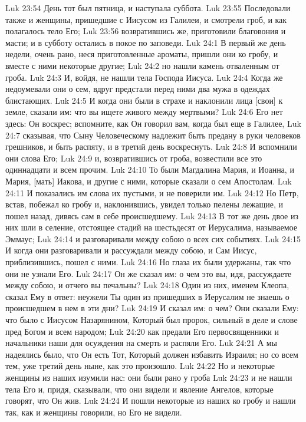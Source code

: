 Luk 23:54  День тот был пятница, и наступала суббота.
Luk 23:55  Последовали также и женщины, пришедшие с Иисусом из Галилеи, и смотрели гроб, и как полагалось тело Его;
Luk 23:56  возвратившись же, приготовили благовония и масти; и в субботу остались в покое по заповеди.
Luk 24:1  В первый же день недели, очень рано, неся приготовленные ароматы, пришли они ко гробу, и вместе с ними некоторые другие;
Luk 24:2  но нашли камень отваленным от гроба.
Luk 24:3  И, войдя, не нашли тела Господа Иисуса.
Luk 24:4  Когда же недоумевали они о сем, вдруг предстали перед ними два мужа в одеждах блистающих.
Luk 24:5  И когда они были в страхе и наклонили лица [свои] к земле, сказали им: что вы ищете живого между мертвыми?
Luk 24:6  Его нет здесь: Он воскрес; вспомните, как Он говорил вам, когда был еще в Галилее,
Luk 24:7  сказывая, что Сыну Человеческому надлежит быть предану в руки человеков грешников, и быть распяту, и в третий день воскреснуть.
Luk 24:8  И вспомнили они слова Его;
Luk 24:9  и, возвратившись от гроба, возвестили все это одиннадцати и всем прочим.
Luk 24:10  То были Магдалина Мария, и Иоанна, и Мария, [мать] Иакова, и другие с ними, которые сказали о сем Апостолам.
Luk 24:11  И показались им слова их пустыми, и не поверили им.
Luk 24:12  Но Петр, встав, побежал ко гробу и, наклонившись, увидел только пелены лежащие, и пошел назад, дивясь сам в себе происшедшему.
Luk 24:13  В тот же день двое из них шли в селение, отстоящее стадий на шестьдесят от Иерусалима, называемое Эммаус;
Luk 24:14  и разговаривали между собою о всех сих событиях.
Luk 24:15  И когда они разговаривали и рассуждали между собою, и Сам Иисус, приблизившись, пошел с ними.
Luk 24:16  Но глаза их были удержаны, так что они не узнали Его.
Luk 24:17  Он же сказал им: о чем это вы, идя, рассуждаете между собою, и отчего вы печальны?
Luk 24:18  Один из них, именем Клеопа, сказал Ему в ответ: неужели Ты один из пришедших в Иерусалим не знаешь о происшедшем в нем в эти дни?
Luk 24:19  И сказал им: о чем? Они сказали Ему: что было с Иисусом Назарянином, Который был пророк, сильный в деле и слове пред Богом и всем народом;
Luk 24:20  как предали Его первосвященники и начальники наши для осуждения на смерть и распяли Его.
Luk 24:21  А мы надеялись было, что Он есть Тот, Который должен избавить Израиля; но со всем тем, уже третий день ныне, как это произошло.
Luk 24:22  Но и некоторые женщины из наших изумили нас: они были рано у гроба
Luk 24:23  и не нашли тела Его и, придя, сказывали, что они видели и явление Ангелов, которые говорят, что Он жив.
Luk 24:24  И пошли некоторые из наших ко гробу и нашли так, как и женщины говорили, но Его не видели.
